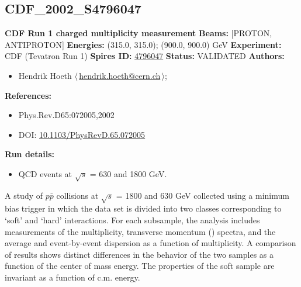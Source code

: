 \clearpage


\clearpage

\subsection[CDF\_2002\_S4796047]{CDF\_2002\_S4796047\,\cite{Acosta:2001rm}}
\textbf{CDF Run 1 charged multiplicity measurement}\newline
\textbf{Beams:} [PROTON, ANTIPROTON] \newline
\textbf{Energies:} (315.0, 315.0); (900.0, 900.0) GeV \newline
\textbf{Experiment:} CDF (Tevatron Run 1) \newline
\textbf{Spires ID:} \href{http://www.slac.stanford.edu/spires/find/hep/www?rawcmd=key+4796047}{4796047}\newline
\textbf{Status:} VALIDATED\newline
\textbf{Authors:}
\begin{itemize}
  \item Hendrik Hoeth $\langle\,$\href{mailto:hendrik.hoeth@cern.ch}{hendrik.hoeth@cern.ch}$\,\rangle$;
\end{itemize}
\textbf{References:}
\begin{itemize}
  \item Phys.Rev.D65:072005,2002
  \item DOI: \href{http://dx.doi.org/10.1103/PhysRevD.65.072005}{10.1103/PhysRevD.65.072005}
\end{itemize}
\textbf{Run details:}
\begin{itemize}

  \item QCD events at \ensuremath{\sqrt{s}} = 630 and 1800 GeV.\end{itemize}

\noindent A study of $p\bar{p}$ collisions at \ensuremath{\sqrt{s}} = 1800 and 630 GeV collected using a minimum bias trigger in which the data set is divided into two classes corresponding to `soft' and `hard' interactions. For each subsample, the analysis includes measurements of the multiplicity, transverse momentum (\pT) spectra, and the average \pT and event-by-event \pT dispersion as a function of multiplicity. A comparison of results shows distinct differences in the behavior of the two samples as a function of the center of mass energy. The properties of the soft sample are invariant as a function of c.m. energy.

